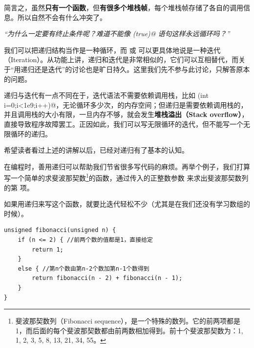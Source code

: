 简言之，虽然\textbf{只有一个函数}，但\textbf{有很多个堆栈帧}，每个堆栈帧存储了各自的调用信息。所以自然不会有什么冲突了。\par
\textit{``为什么一定要有终止条件呢？难道不能像 \lstinline@while(true)@ 语句这样永远循环吗？''}\par
我们可以把递归结构当作是一种循环，而 \lstinline@for@ 或 \lstinline@while@ 可以更具体地说是一种迭代（Iteration）。从功能上讲，递归和迭代是非常相似的，它们可以互相替代，而关于``用递归还是迭代''的讨论也是旷日持久。这里我们先不参与此讨论，只解答原本的问题。\par
递归与迭代有一点不同在于，迭代语法不需要依赖调用栈，比如 \lstinline@for(int i=0;i<1e9;i++)@，无论循环多少次， \lstinline@int@ 的内存空间；但递归是需要依赖调用栈的，并且调用栈的大小有限，一旦内存不够，就会发生\textbf{堆栈溢出（Stack overflow）}，直接导致程序故障罢工。正因如此，我们可以写无限循环的迭代，但不能写一个无限循环的递归。\par
希望读者看过上述的讲解以后，已经对递归有了基本的认知。\par
在编程时，善用递归可以帮助我们节省很多写代码的麻烦。再举个例子，我们打算写一个简单的求斐波那契数\footnote{斐波那契数列（Fibonacci sequence），是一个特殊的数列。它的前两项都是1，而后面的每个斐波那契数都由前两数相加得到。前十个斐波那契数为：1, 1, 2, 3, 5, 8, 13, 21, 34, 55。}的函数，通过传入的正整数参数 \lstinline@n@ 来求出斐波那契数列的第 \lstinline@n@ 项。\par
如果用递归来写这个函数，就要比迭代轻松不少（尤其是在我们还没有学习数组的时候）。\par
\begin{lstlisting}
unsigned fibonacci(unsigned n) {
    if (n <= 2) { //前两个数的值都是1，直接给定
        return 1;
    }
    else { //第n个数由第n-2个数加第n-1个数得到
        return fibonacci(n - 2) + fibonacci(n - 1);
    }
}
\end{lstlisting}\par
